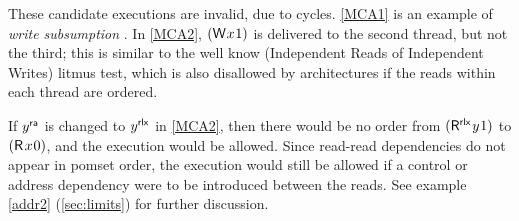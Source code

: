 These candidate executions are invalid, due to cycles.
\ref{MCA1} is an example of \emph{write subsumption}
\cite[]{DBLP:journals/pacmpl/PulteFDFSS18}.
 In \ref{MCA2}, $(\DW{x}{1})$ is delivered to the second thread, but not
the third; this is similar to the well know \iriw{} (Independent
Reads of Independent Writes) litmus test, which is also disallowed by \mca{}
architectures if the reads within each thread are ordered. 

If $y^{\mathsf{ra}}$ is changed to $y^{\mathsf{rlx}}$ in \ref{MCA2}, then there would be no order
from $(\DR[\modeRLX]{y}{1})$ to $(\DR{x}{0})$, and the execution would be
allowed.  Since read-read dependencies do not appear in pomset order, the
execution would still be allowed if a control or address dependency were to
be introduced between the reads. See example \ref{addr2}
(\textsection\ref{sec:limits}) for further discussion.



